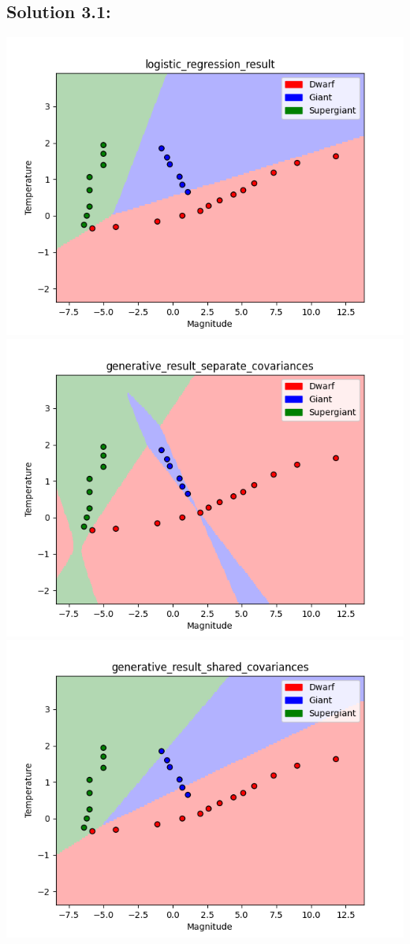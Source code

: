 \documentclass[submit]{harvardml}
\begin{document}
\subsection*{Solution 3.1:}
\begin{center}
\includegraphics[scale = 0.75]{logistic_regression_result.png} \\
\includegraphics[scale = 0.75]{generative_result_separate_covariances.png} \\
\includegraphics[scale = 0.75]{generative_result_shared_covariances.png} \\

\end{center}
\end{document}
